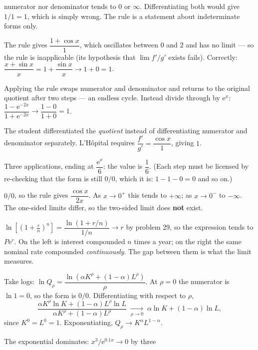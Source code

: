 \begin{solutions}
        numerator nor denominator tends to $0$ or $\infty$. Differentiating
        both would give $1/1=1$, which is simply wrong. The rule is a
        statement about indeterminate forms only.
  \item The rule gives $\dfrac{1+\cos x}{1}$, which oscillates between $0$
        and $2$ and has no limit --- so the rule is inapplicable
        (its hypothesis that $\lim f'/g'$ exists fails). Correctly:
        $\dfrac{x+\sin x}{x}=1+\dfrac{\sin x}{x}\to1+0=1$.
  \item Applying the rule swaps numerator and denominator and returns to
        the original quotient after two steps --- an endless cycle. Instead
        divide through by $\mathrm{e}^{x}$:
        $\dfrac{1-\mathrm{e}^{-2x}}{1+\mathrm{e}^{-2x}}\to
        \dfrac{1-0}{1+0}=1$.
  \item The student differentiated the \emph{quotient} instead of
        differentiating numerator and denominator separately. L'H\^opital
        requires $\dfrac{f'}{g'}=\dfrac{\cos x}{1}$, giving $1$.
  \item Three applications, ending at
        $\dfrac{\mathrm{e}^{x}}{6}$: the value is $\dfrac16$. (Each step
        must be licensed by re-checking that the form is still $0/0$, which
        it is: $1-1-0=0$ and so on.)
  \item $0/0$, so the rule gives $\dfrac{\cos x}{2x}$. As
        $x\to0^{+}$ this tends to $+\infty$; as $x\to0^{-}$ to
        $-\infty$. The one-sided limits differ, so the two-sided limit does
        \textbf{not} exist.
  \item $\ln\!\left[\left(1+\frac{r}{n}\right)^{n}\right]
        =\dfrac{\ln(1+r/n)}{1/n}\to r$ by problem 29, so the expression
        tends to $P\mathrm{e}^{r}$. On the left is interest compounded $n$
        times a year; on the right the same nominal rate compounded
        \emph{continuously}. The gap between them is what the limit
        measures.
  \item Take logs: $\ln Q_{\rho}
        =\dfrac{\ln(\alpha K^{\rho}+(1-\alpha)L^{\rho})}{\rho}$. At
        $\rho=0$ the numerator is $\ln1=0$, so the form is $0/0$.
        Differentiating with respect to $\rho$,
        \[
          \frac{\alpha K^{\rho}\ln K+(1-\alpha)L^{\rho}\ln L}
               {\alpha K^{\rho}+(1-\alpha)L^{\rho}}
          \;\xrightarrow[\rho\to0]{}\;
          \alpha\ln K+(1-\alpha)\ln L ,
        \]
        since $K^{0}=L^{0}=1$. Exponentiating,
        $Q_{\rho}\to K^{\alpha}L^{1-\alpha}$.
  \item The exponential dominates: $x^{3}/\mathrm{e}^{0.1x}\to0$ by three

\end{solutions}

